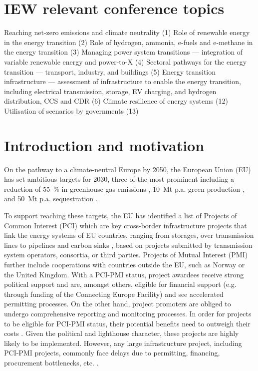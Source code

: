 \documentclass[final,5p,times,twocolumn]{elsarticle}
\let\autocite\cite
\begin{document}


\section*{ IEW relevant conference topics }
Reaching net-zero emissions and climate neutrality (1) Role of renewable energy in the energy transition (2) Role of hydrogen, ammonia, e-fuels and e-methane in the energy transition (3) Managing power system transitions --- integration of variable renewable energy and power-to-X (4) Sectoral pathways for the energy transition --- transport, industry, and buildings (5) Energy transition infrastructure --- assessment of infrastructure to enable the energy transition, including electrical transmission, storage, EV charging, and hydrogen distribution, CCS and CDR (6) Climate resilience of energy systems (12) Utilisation of scenarios by governments (13)

\section{Introduction and motivation}
\label{sec:introduction}

On the pathway to a climate-neutral Europe by 2050, the European Union (EU) has set ambitious targets for 2030, three of the most prominent including a reduction of \SI{55}{\percent} in greenhouse gas emissions \autocite{europeancommissionFit55Delivering2021}, \SI{10}{Mt} p.a. green  production \autocite{europeancommissionREPowerEUPlanCommunication2022}, and \SI{50}{Mt} p.a.  sequestration \autocite{europeanparliamentRegulationEU20242024}.

To support reaching these targets, the EU has identified a list of Projects of Common Interest (PCI) which are key cross-border infrastructure projects that link the energy systems of EU countries, ranging from storages, over transmission lines to pipelines and carbon sinks \autocite{europeancommissionCommissionDelegatedRegulation2023}, based on projects submitted by transmission system operators, consortia, or third parties. Projects of Mutual Interest (PMI) further include cooperations with countries outside the EU, such as Norway or the United Kingdom. With a PCI-PMI status, project awardees receive strong political support and are, amongst others, eligible for financial support (e.g. through funding of the Connecting Europe Facility) and see accelerated permitting processes. On the other hand, project promoters are obliged to undergo comprehensive reporting and monitoring processes. In order for projects to be eligible for PCI-PMI status, their potential benefits need to outweigh their costs \autocite{europeancommissionCommissionDelegatedRegulation2023}. Given the political and lighthouse character, these projects are highly likely to be implemented. However, any large infrastructure project, including PCI-PMI projects, commonly face delays due to permitting, financing, procurement bottlenecks, etc. \autocite{acerConsolidatedReportProgress2023}.
\end{document}
